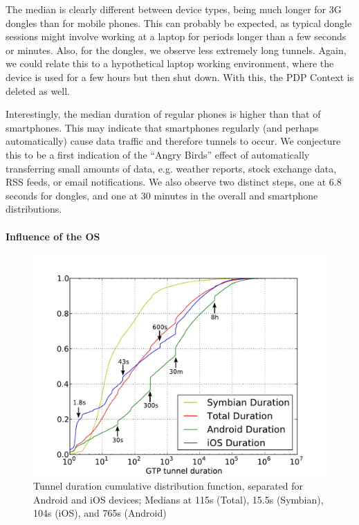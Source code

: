 The median is clearly different between device types, being much longer for 3G dongles than for mobile phones. This can probably be expected, as typical dongle sessions might involve working at a laptop for periods longer than a few seconds or minutes. Also, for the dongles, we observe less extremely long tunnels. Again, we could relate this to a hypothetical laptop working environment, where the device is used for a few hours but then shut down. With this, the PDP Context is deleted as well. 

Interestingly, the median duration of regular phones is higher than that of smartphones. This may indicate that smartphones regularly (and perhaps automatically) cause data traffic and therefore tunnels to occur. We conjecture this to be a first indication of the ``Angry Birds'' effect of automatically transferring small amounts of data, e.g. weather reports, stock exchange data, RSS feeds, or email notifications. We also observe two distinct steps, one at 6.8 seconds for dongles, and one at 30 minutes in the overall and smartphone distributions.


\paragraph{Influence of the OS}

\begin{figure}
	\centering
	\includegraphics[width=\columnwidth]{images/IMC2013/tunnel-dur-os-cdf-mod.pdf}
	\caption{Tunnel duration cumulative distribution function, separated for Android and iOS devices; Medians at 115s (Total), 15.5s (Symbian), 104s (iOS), and 765s (Android)}
	\label{fig:cdf-duration-os}
\end{figure}


